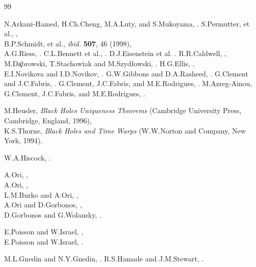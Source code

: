 \documentclass[aps,showpacs,nofootinbib,floatfix]{revtex4}
\begin{document}
\begin{thebibliography}{99}
\def\jams#1#2#3{{ J. Austral. Math. Soc. B} {\bf #1}, #2 (#3)}

%
\def\hepph#1#2{{ hep-ph }{#1} (#2)}
\def\hepth#1#2{{ hep-th }{#1} (#2)}
\def\grqc#1#2{{ gr-qc }{#1} (#2)}
\def\ibid#1#2#3{{ {\it ibid.} }{\bf #1}, #2 (#3)}
%
N.Arkani-Hamed, H.Ch.Cheng, M.A.Luty, and S.Mukoyama, .
S.Permutter, et al., ,\\
B.P.Schmidt, et al., \ibid{507}{46}{1998},\\
A.G.Riess, .
C.L.Bennett et al., .
D.J.Eisenstein et al. .
R.R.Caldwell, ,\\
M.D\c{a}browski, T.Stachowiak and M.Szyd{\l}owski, .
H.G.Ellis, ,\\
E.I.Novikova and I.D.Novikov, .
G.W.Gibbons and D.A.Rasheed, .
G.Clement and J.C.Fabris, .
G.Clement, J.C.Fabris, and M.E.Rodrigues, .
M.Azreg-Ainou, G.Clement, J.C.Fabris, and M.E.Rodrigues, .

M.Heusler, {\it Black Holes Uniqueness Theorems}
(Cambridge University Press, Cambridge, England, 1996), \\
K.S.Thorne, {\it Black Holes and Time Warps} (W.W.Norton and Company,
New York, 1994). 

W.A.Hiscock, .

A.Ori, ,\\
A.Ori, ,\\
L.M.Burko and A.Ori, ,\\
A.Ori and D.Gorbonos, ,\\
D.Gorbonos and G.Wolansky, .

E.Poisson and W.Israel, ,\\
E.Poisson and W.Israel, .

M.L.Gnedin and N.Y.Gnedin, .
R.S.Hamade and J.M.Stewart, .


\end{thebibliography}
\end{document}
